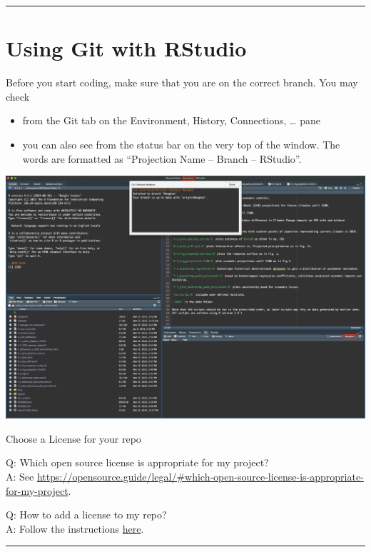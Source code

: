 \documentclass[
]{book}
\providecommand{\tightlist}{%
  \setlength{\itemsep}{0pt}\setlength{\parskip}{0pt}}
\begin{document}
\begin{center}\rule{0.5\linewidth}{0.5pt}\end{center}

\section{Using Git with RStudio}\label{using-git-with-rstudio}

Before you start coding, make sure that you are on the correct branch. You may check

\begin{itemize}
\tightlist
\item
  from the Git tab on the Environment, History, Connections, \ldots{} pane
\item
  you can also see from the status bar on the very top of the window. The words are formatted as ``Projection Name -- Branch -- RStudio''.
\end{itemize}

\includegraphics[width=1\linewidth]{images/R git branch}

Choose a License for your repo

Q: Which open source license is appropriate for my project?\\
A: See \url{https://opensource.guide/legal/\#which-open-source-license-is-appropriate-for-my-project}.

Q: How to add a license to my repo?\\
A: Follow the instructions \href{https://docs.github.com/en/communities/setting-up-your-project-for-healthy-contributions/adding-a-license-to-a-repository}{here}.

\begin{center}\rule{0.5\linewidth}{0.5pt}\end{center}
\end{document}
